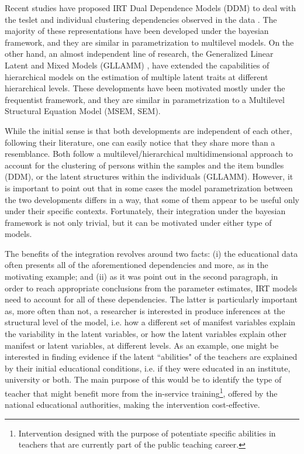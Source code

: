 Recent studies have proposed IRT Dual Dependence Models (DDM) to deal with the teslet and individual clustering dependencies observed in the data \cite{Fujimoto_2020, Fujimoto_2018a, Fujimoto_2018b, Jiao_et_al_2012, Flores_2012, Fox_2010, Reckase_2009, Bradlow_1999}. The majority of these representations have been developed under the bayesian framework, and they are similar in parametrization to multilevel models. On the other hand, an almost independent line of research, the Generalized Linear Latent and Mixed Models (GLLAMM) \cite{Rabe_et_al_2004a, Rabe_et_al_2004b, Skrondal_et_al_2004a, Rabe_et_al_2012}, have extended the capabilities of hierarchical models on the estimation of multiple latent traits at different hierarchical levels. These developments have been motivated mostly under the frequentist framework, and they are similar in parametrization to a Multilevel Structural Equation Model (MSEM, SEM).

While the initial sense is that both developments are independent of each other, following their literature, one can easily notice that they share more than a resemblance. Both follow a multilevel/hierarchical multidimensional approach to account for the clustering of persons within the samples and the item bundles (DDM), or the latent structures within the individuals (GLLAMM). However, it is important to point out that in some cases the model parametrization between the two developments differs in a way, that some of them appear to be useful only under their specific contexts. Fortunately, their integration under the bayesian framework is not only trivial, but it can be motivated under either type of models.

The benefits of the integration revolves around two facts: (i) the educational data often presents all of the aforementioned dependencies and more, as in the motivating example; and (ii) as it was point out in the second paragraph, in order to reach appropriate conclusions from the parameter estimates, IRT models need to account for all of these dependencies. The latter is particularly important as, more often than not, a researcher is interested in produce inferences at the structural level of the model, i.e. how a different set of manifest variables explain the variability in the latent variables, or how the latent variables explain other manifest or latent variables, at different levels. As an example, one might be interested in finding evidence if the latent ``abilities" of the teachers are explained by their initial educational conditions, i.e. if they were educated in an institute, university or both. The main purpose of this would be to identify the type of teacher that might benefit more from the in-service training\footnote{Intervention designed with the purpose of potentiate specific abilities in teachers that are currently part of the public teaching career.}, offered by the national educational authorities, making the intervention cost-effective.

